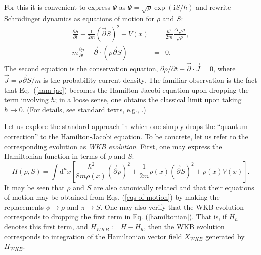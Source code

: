 \documentclass[12pt,aps,eqsecnum,tighten]{revtex4-2}
\def\be{\begin{equation}}
\def\ee{\end{equation}}
\def\ba{\begin{eqnarray}}
\def\ea{\end{eqnarray}}
\def\d{{\mathrm d}}
\def\i{\mathrm{i}}
\newcommand{\eqn}[1]{Eq.~(\ref{#1})}
\begin{document}
For this it is convenient to express $\Psi$ as $\Psi =
\sqrt{\rho}\exp( \i S/\hbar )$ and rewrite Schr\"odinger dynamics as
equations of motion for $\rho$ and $S$:
%
\ba\label{ham-jac}
\frac{\partial S}{\partial t} + \frac{1}{2m}(\vec{\partial}S)^2
+ V(x)&=& \frac{\hbar^2}{2m} \frac{\Delta \sqrt{\rho}}
{\sqrt{\rho}},\\
%
m\frac{\partial \rho}{\partial t} + \vec{\partial} \cdot
(\rho \vec{\partial} S) &=& 0.
\ea
%
The second equation is the conservation equation, $\partial \rho /
\partial t + \vec{\partial}\cdot \vec{J} = 0$, where $\vec{J} =
\rho\vec{\partial}S/m$ is the probability current density.  The
familiar observation is the fact that \eqn{ham-jac} becomes the
Hamilton-Jacobi equation upon dropping the term involving $\hbar$; in
a loose sense, one obtains the classical limit upon taking $\hbar
\rightarrow 0$. (For details, see standard texts, e.g.,
\cite{goldstein,lanczos}.)

Let us explore the standard approach in which one simply drops the
``quantum correction'' to the Hamilton-Jacobi equation.  To be
concrete, let us refer to the corresponding evolution
as {\it WKB evolution}.  First, one may
express the Hamiltonian function in terms of $\rho$ and $S$:
%
\be \label{hamiltonian}
H(\rho, S) = \int \d^n\!x \left[ \frac{\hbar^2}{8m\rho(x)}
(\vec{\partial}\rho)^2
+ \frac{1}{2m}\rho(x) (\vec{\partial} S)^2 + \rho(x)V(x)\right].
\ee
%
It may be seen that $\rho$ and $S$ are also canonically related and
that their equations of motion may be obtained from
Eqs. (\ref{eqs-of-motion}) by making the replacements $\phi
\rightarrow \rho$ and $\pi \rightarrow S$.  One may also verify that
the WKB evolution corresponds to dropping the first term in
Eq. (\ref{hamiltonian}).  That is, if $H_\hbar$ denotes this first
term, and $H_{WKB} := H - H_\hbar$, then the WKB evolution corresponds
to integration of the Hamiltonian vector field $X_{WKB}$ generated by
$H_{WKB}$.
\end{document}
